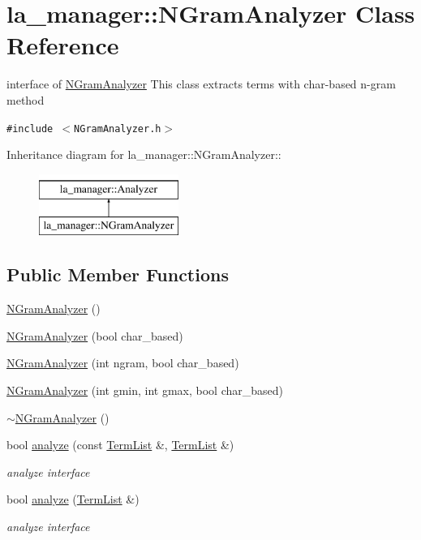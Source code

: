 \hypertarget{classla__manager_1_1NGramAnalyzer}{
\section{la\_\-manager::NGramAnalyzer Class Reference}
\label{classla__manager_1_1NGramAnalyzer}
}
interface of \hyperlink{classla__manager_1_1NGramAnalyzer}{NGramAnalyzer} This class extracts terms with char-based n-gram method  


{\tt \#include $<$NGramAnalyzer.h$>$}

Inheritance diagram for la\_\-manager::NGramAnalyzer::\begin{figure}[H]
\begin{center}
\leavevmode
\includegraphics[height=2cm]{classla__manager_1_1NGramAnalyzer}
\end{center}
\end{figure}
\subsection*{Public Member Functions}
\begin{CompactItemize}
\item 
\hyperlink{classla__manager_1_1NGramAnalyzer_05e6b652c06667bb8a860c710bc438c6}{NGramAnalyzer} ()
\item 
\hyperlink{classla__manager_1_1NGramAnalyzer_952815ff68d49c40b0ecf1f5d1617b31}{NGramAnalyzer} (bool char\_\-based)
\item 
\hyperlink{classla__manager_1_1NGramAnalyzer_4f19056e90bd0a8235c78d179ab4e723}{NGramAnalyzer} (int ngram, bool char\_\-based)
\item 
\hyperlink{classla__manager_1_1NGramAnalyzer_6e4a166130e6c68ef77da3639c9cae58}{NGramAnalyzer} (int gmin, int gmax, bool char\_\-based)
\item 
\hyperlink{classla__manager_1_1NGramAnalyzer_e0de14f9762805085a4d09772c0c50f5}{$\sim$NGramAnalyzer} ()
\item 
bool \hyperlink{classla__manager_1_1NGramAnalyzer_09bdd966dba6ac9b3ef4858fd0b24699}{analyze} (const \hyperlink{namespacela__manager_06c0aab93982ee3ebc3ef9d0419e619a}{TermList} \&, \hyperlink{namespacela__manager_06c0aab93982ee3ebc3ef9d0419e619a}{TermList} \&)
\begin{CompactList}\small\item\em analyze interface \item\end{CompactList}\item 
bool \hyperlink{classla__manager_1_1NGramAnalyzer_9774217127e1d89b57ff5aded31df290}{analyze} (\hyperlink{namespacela__manager_06c0aab93982ee3ebc3ef9d0419e619a}{TermList} \&)
\begin{CompactList}\small\item\em analyze interface \item\end{CompactList}\end{CompactItemize}
